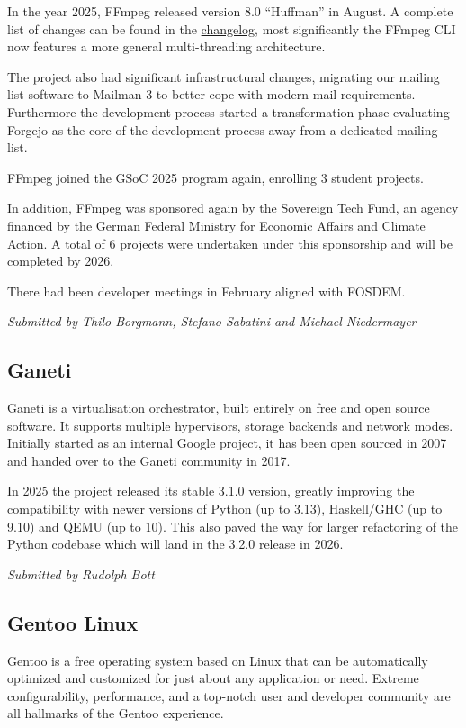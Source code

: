 \documentclass[a4paper]{report}
\begin{document}
In the year 2025, FFmpeg released version 8.0 ``Huffman'' in August. A complete list of changes can be found in the \href{https://git.ffmpeg.org/gitweb/ffmpeg.git/blob/HEAD:/Changelog}{changelog}, most significantly the FFmpeg CLI now features a more general multi-threading architecture.

The project also had significant infrastructural changes, migrating our mailing list software to Mailman 3 to better cope with modern mail requirements. Furthermore the development process started a transformation phase evaluating Forgejo as the core of the development process away from a dedicated mailing list.

FFmpeg joined the GSoC 2025 program again, enrolling 3 student projects.

In addition, FFmpeg was sponsored again by the Sovereign Tech Fund, an agency financed by the German Federal Ministry for Economic Affairs and Climate Action. A total of 6 projects were undertaken under this sponsorship and will be completed by 2026.

There had been developer meetings in February aligned with FOSDEM.

{\em Submitted by Thilo Borgmann, Stefano Sabatini and Michael Niedermayer}

\subsection{Ganeti}

Ganeti is a virtualisation orchestrator, built entirely on free and open source software. It supports multiple hypervisors, storage backends and network modes. Initially started as an internal Google project, it has been open sourced in 2007 and handed over to the Ganeti community in 2017.

In 2025 the project released its stable 3.1.0 version, greatly improving the compatibility with newer versions of Python (up to 3.13), Haskell/GHC (up to 9.10) and QEMU (up to 10). This also paved the way for larger refactoring of the Python codebase which will land in the 3.2.0 release in 2026.

{\em Submitted by Rudolph Bott}

\subsection{Gentoo Linux}

Gentoo is a free operating system based on Linux that can be automatically optimized and customized for just about any application or need. Extreme configurability, performance, and a top-notch user and developer community are all hallmarks of the Gentoo experience.
\end{document}
